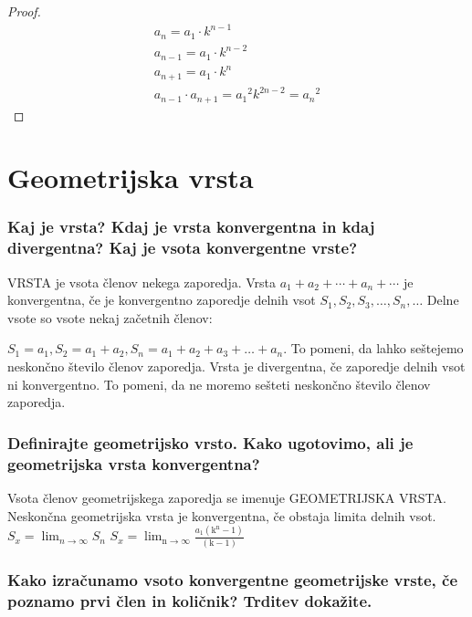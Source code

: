 \documentclass{article}
\begin{document}
\begin{proof}
    \begin{gather}
        a_n = a_1 \cdot k^{n-1} \\
        a_{n-1} = a_1 \cdot k^{n-2} \\
        a_{n+1} = a_1  \cdot k^{n} \\
        a_{n-1} \cdot a_{n+1} = {a_1}^2 k^{2n-2} = {a_n}^2
    \end{gather}
\end{proof}

\section{Geometrijska vrsta}
\subsubsection*{Kaj je vrsta? Kdaj je vrsta konvergentna in kdaj divergentna? Kaj je vsota konvergentne vrste?}

VRSTA je vsota členov nekega zaporedja. Vrsta $a_{1}+a_{2}+\cdots+a_{n}+\cdots$ je konvergentna, če je konvergentno zaporedje delnih vsot $S_{1}, S_{2}, S_{3}, \ldots, S_{n}, \ldots$ Delne vsote so vsote nekaj začetnih členov:

$S_{1}=a_{1}, S_{2}=a_{1}+a_{2}, S_{n}=a_{1}+a_{2}+a_{3}+\ldots+a_{n}$. To pomeni, da lahko seštejemo neskončno število členov zaporedja. Vrsta je divergentna, če zaporedje delnih vsot ni konvergentno. To pomeni, da ne moremo sešteti neskončno število členov zaporedja.



\subsubsection*{Definirajte geometrijsko vrsto. Kako ugotovimo, ali je geometrijska vrsta konvergentna?}

Vsota členov geometrijskega zaporedja se imenuje GEOMETRIJSKA VRSTA. Neskončna geometrijska vrsta je konvergentna, če obstaja limita delnih vsot. $S_{x}=\lim _{n \rightarrow \infty} S_{n}$ $S_{x}=\lim _{\mathrm{n} \rightarrow \infty} \frac{a_{1}\left(\mathrm{k}^{\mathrm{n}}-1\right)}{(\mathrm{k}-1)}$


\subsubsection*{Kako izračunamo vsoto konvergentne geometrijske vrste, če poznamo prvi člen in količnik? Trditev dokažite.}
\end{document}
